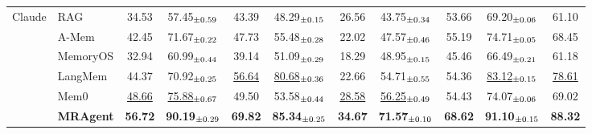 \begin{table}[t]
\begin{tabular}{ll|cc|cc|cc|cc|c}
\midrule
\multirow{5}{*}{Claude}
& RAG
& 34.53 & 57.45$_{\scriptsize \pm 0.59}$
& 43.39 & 48.29$_{\scriptsize \pm 0.15}$
& 26.56 & 43.75$_{\scriptsize \pm 0.34}$
& 53.66 & 69.20$_{\scriptsize \pm 0.06}$
& 61.10 \\
& A-Mem
& 42.45 & 71.67$_{\scriptsize \pm 0.22}$
& 47.73 & 55.48$_{\scriptsize \pm 0.28}$
& 22.02 & 47.57$_{\scriptsize \pm 0.46}$
& 55.19 & 74.71$_{\scriptsize \pm 0.05}$
& 68.45 \\
& MemoryOS
& 32.94 & 60.99$_{\scriptsize \pm 0.44}$
& 39.14 & 51.09$_{\scriptsize \pm 0.29}$
& 18.29 & 48.95$_{\scriptsize \pm 0.15}$
& 45.46 & 66.49$_{\scriptsize \pm 0.21}$
& 61.18 \\
& LangMem
& 44.37 & 70.92$_{\scriptsize \pm 0.25}$
& \underline{56.64} & \underline{80.68$_{\scriptsize \pm 0.36}$}
& 22.66 & 54.71$_{\scriptsize \pm 0.55}$
& 54.36 & \underline{83.12$_{\scriptsize \pm 0.15}$}
& \underline{78.61} \\
& Mem0
& \underline{48.66} & \underline{75.88$_{\scriptsize \pm 0.67}$}
& 49.50 & 53.58$_{\scriptsize \pm 0.44}$
& \underline{28.58} & \underline{56.25$_{\scriptsize \pm 0.49}$}
& 54.43 & 74.07$_{\scriptsize \pm 0.06}$
& 69.02 \\
& \textbf{MRAgent}
& \textbf{56.72} & \textbf{90.19$_{\scriptsize \pm 0.29}$}
& \textbf{69.82} & \textbf{85.34$_{\scriptsize \pm 0.25}$}
& \textbf{34.67} & \textbf{71.57$_{\scriptsize \pm 0.10}$}
& \textbf{68.62} & \textbf{91.10$_{\scriptsize \pm 0.15}$}
& \textbf{88.32} \\

\bottomrule
\end{tabular}
\label{tab:reasoning_results}
\end{table}



